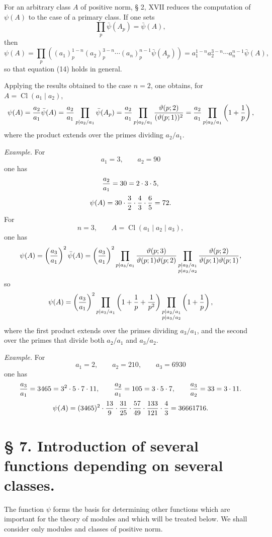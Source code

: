 \documentclass[11pt,a4paper]{article}
\newcommand{\Cl}{\operatorname{Cl}}
\newcommand{\tht}{\vartheta}
\begin{document}
For an arbitrary class $A$ of positive norm, § 2, XVII reduces the computation of $\psi(A)$ to the case of a primary class. If one sets
\[
 \prod_p\bar\psi(A_p)=\bar\psi(A),
\]
then
\[
 \psi(A)=\prod_p\left((a_1)_p^{1-n}(a_2)_p^{3-n}\cdots(a_n)_p^{n-1}\bar\psi(A_p)\right)
 =a_1^{1-n}a_2^{3-n}\cdots a_n^{n-1}\bar\psi(A),
\]
so that equation (14) holds in general.

Applying the results obtained to the case $n=2$, one obtains, for $A=\Cl(a_1\mid a_2)$,
\[
 \psi(A)={a_2\over a_1}\bar\psi(A)
 ={a_2\over a_1}\prod_{p\mid a_2/a_1}\bar\psi(A_p)
 ={a_2\over a_1}\prod_{p\mid a_2/a_1}{\tht(p;2)\over(\tht(p;1))^2}
 ={a_2\over a_1}\prod_{p\mid a_2/a_1}\left(1+{1\over p}\right),
\]
where the product extends over the primes dividing $a_2/a_1$.

\emph{Example.} For
\[
 a_1=3,\qquad a_2=90
\]
one has
\[
 {a_2\over a_1}=30=2\cdot3\cdot5,
\]
\[
 \psi(A)=30\cdot {3\over2}\cdot {4\over3}\cdot {6\over5}=72.
\]
For
\[
 n=3,
 \qquad A=\Cl(a_1\mid a_2\mid a_3),
\]
one has
\[
 \psi(A)=\left({a_3\over a_1}\right)^2\bar\psi(A)
 =\left({a_3\over a_1}\right)^2
 \prod_{p\mid a_3/a_1}{\tht(p;3)\over\tht(p;1)\tht(p;2)}
 \prod_{\substack{p\mid a_2/a_1\\ p\mid a_3/a_2}}
 {\tht(p;2)\over\tht(p;1)\tht(p;1)},
\]
so
\[
 \psi(A)=\left({a_3\over a_1}\right)^2
 \prod_{p\mid a_3/a_1}\left(1+{1\over p}+{1\over p^2}\right)
 \prod_{\substack{p\mid a_2/a_1\\ p\mid a_3/a_2}}
 \left(1+{1\over p}\right),
\]
where the first product extends over the primes dividing $a_3/a_1$, and the second over the primes that divide both $a_2/a_1$ and $a_3/a_2$.

\emph{Example.} For
\[
 a_1=2,\qquad a_2=210,\qquad a_3=6930
\]
one has
\[
 {a_3\over a_1}=3465=3^2\cdot5\cdot7\cdot11,
 \qquad {a_2\over a_1}=105=3\cdot5\cdot7,
 \qquad {a_3\over a_2}=33=3\cdot11.
\]
\[
 \psi(A)=(3465)^2\cdot {13\over9}\cdot {31\over25}\cdot {57\over49}\cdot {133\over121}\cdot {4\over3}=36661716.
\]

\section*{§ 7. Introduction of several functions depending on several classes.}

The function $\psi$ forms the basis for determining other functions which are important for the theory of modules and which will be treated below. We shall consider only modules and classes of positive norm.
\end{document}
